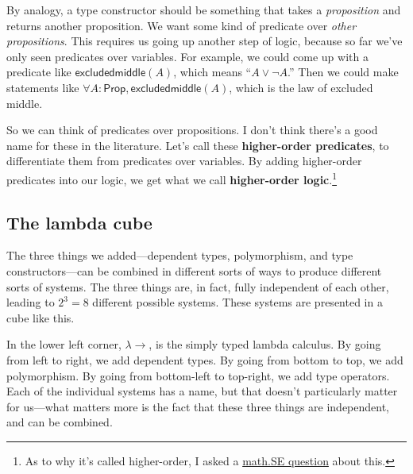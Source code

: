\documentclass[11pt,paper=letter]{scrartcl}
\newcommand{\sf}{\mathsf}
\renewcommand{\lor}{\vee}
\renewcommand{\lnot}{\neg}
\newcommand{\prop}{\mathsf{Prop}}
\begin{document}
By analogy, a type constructor should be something that takes a \emph{proposition} and returns another proposition. We want some kind of predicate over \emph{other propositions}. This requires us going up another step of logic, because so far we've only seen predicates over variables. For example, we could come up with a predicate like $\sf{excludedmiddle}(A)$, which means ``$A \lor \lnot A$.'' Then we could make statements like $\forall A: \prop, \sf{excludedmiddle}(A)$, which is the law of excluded middle.

So we can think of predicates over propositions. I don't think there's a good name for these in the literature. Let's call these \textbf{higher-order predicates}, to differentiate them from predicates over variables. By adding higher-order predicates into our logic, we get what we call \textbf{higher-order logic}.\footnote{As to why it's called higher-order, I asked a \href{https://math.stackexchange.com/questions/4232108}{math.SE question} about this.} 

\subsection{The lambda cube}

The three things we added---dependent types, polymorphism, and type constructors---can be combined in different sorts of ways to produce different sorts of systems. The three things are, in fact, fully independent of each other, leading to $2^3 = 8$ different possible systems. These systems are presented in a cube like this.

\begin{center}
\end{center}

In the lower left corner, $\lambda \to$, is the simply typed lambda calculus. By going from left to right, we add dependent types. By going from bottom to top, we add polymorphism. By going from bottom-left to top-right, we add type operators. Each of the individual systems has a name, but that doesn't particularly matter for us---what matters more is the fact that these three things are independent, and can be combined.
\end{document}
